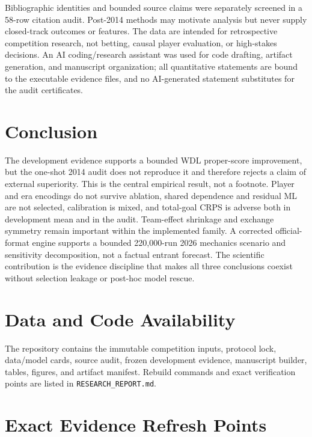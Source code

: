 \documentclass[11pt]{article}
\begin{document}
Bibliographic identities and bounded source claims were separately screened in a 58-row citation
audit.  Post-2014 methods may motivate analysis but never supply closed-track outcomes or features.
The data are intended for retrospective competition research, not betting, causal player
evaluation, or high-stakes decisions.  An AI coding/research assistant was used for code drafting,
artifact generation, and manuscript organization; all quantitative statements are bound to the
executable evidence files, and no AI-generated statement substitutes for the audit certificates.

\section{Conclusion}

The development evidence supports a bounded WDL proper-score improvement, but the one-shot 2014
audit does not reproduce it and therefore rejects a claim of external superiority.  This is the
central empirical result, not a footnote.  Player and era encodings do not survive ablation, shared
dependence and residual ML are not selected, calibration is mixed, and total-goal CRPS is adverse
both in development mean and in the audit.  Team-effect shrinkage and exchange symmetry remain
important within the implemented family.  A corrected official-format engine supports a bounded
220,000-run 2026 mechanics scenario and sensitivity decomposition, not a factual entrant forecast.
The scientific contribution is the evidence discipline that makes all three conclusions coexist
without selection leakage or post-hoc model rescue.

\section*{Data and Code Availability}

The repository contains the immutable competition inputs, protocol lock, data/model cards, source
audit, frozen development evidence, manuscript builder, tables, figures, and artifact manifest.
Rebuild commands and exact verification points are listed in \texttt{RESEARCH\_REPORT.md}.




\appendix
\small
\section{Exact Evidence Refresh Points}
\end{document}

